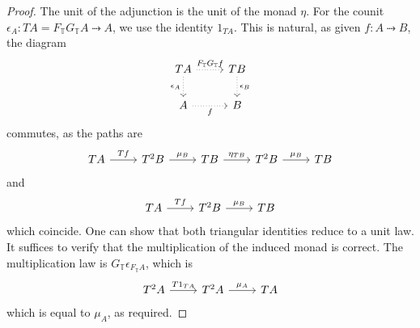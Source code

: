 \begin{proof}
    The unit of the adjunction is the unit of the monad \( \eta \).
    For the counit \( \epsilon_A : TA = F_{\mathbb T} G_{\mathbb T} A \rightdotarrow A \), we use the identity \( 1_{TA} \).
    This is natural, as given \( f : A \rightdotarrow B \), the diagram
\[\begin{tikzcd}
	TA & TB \\
	A & B
	\arrow["{F_{\mathbb T} G_{\mathbb T}f}", dotted, from=1-1, to=1-2]
	\arrow["{\epsilon_B}", dotted, from=1-2, to=2-2]
	\arrow["{\epsilon_A}"', dotted, from=1-1, to=2-1]
	\arrow["f"', dotted, from=2-1, to=2-2]
\end{tikzcd}\]
    commutes, as the paths are%
    \[\begin{tikzcd}
        TA & {T^2B} & TB & {T^2B} & TB
        \arrow["Tf", from=1-1, to=1-2]
        \arrow["{\mu_B}", from=1-2, to=1-3]
        \arrow["{\eta_{TB}}", from=1-3, to=1-4]
        \arrow["{\mu_B}", from=1-4, to=1-5]
    \end{tikzcd}\]
    and
\[\begin{tikzcd}
	TA & {T^2B} & TB
	\arrow["Tf", from=1-1, to=1-2]
	\arrow["{\mu_B}", from=1-2, to=1-3]
\end{tikzcd}\]
    which coincide.
    One can show that both triangular identities reduce to a unit law.
    It suffices to verify that the multiplication of the induced monad is correct.
    The multiplication law is \( G_{\mathbb T} \epsilon_{F_{\mathbb T} A} \), which is
\[\begin{tikzcd}
	{T^2A} & {T^2A} & TA
	\arrow["{T1_{TA}}", from=1-1, to=1-2]
	\arrow["{\mu_A}", from=1-2, to=1-3]
\end{tikzcd}\]
    which is equal to \( \mu_A \), as required.
\end{proof}

